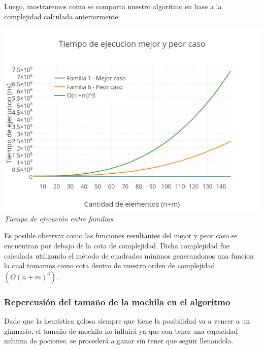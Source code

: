 Luego, mostraremos como se comporta nuestro algoritmo en base a la complejidad calculada anteriormente:

\vspace*{0.3cm} \vspace*{0.3cm}
  \begin{center}
\includegraphics[scale=0.60]{./EJ2/mejorcaso.png}
\\{\textit{Tiempo de ejecución entre familias}}
  \end{center}
  \vspace*{0.3cm}
  
  
Es posible observar como las funciones resultantes del mejor y peor caso se encuentran por debajo de la cota de complejidad. Dicha complejidad fue calculada utilizando el m\'etodo de cuadrados m\'inimos generandonos una funcion la cual tomamos como cota dentro de nuestro orden de complejidad $(O(n+m)^3)$.

\subsubsection*{Repercusi\'on del tamaño de la mochila en el algoritmo}

Dado que la heur\'istica golosa siempre que tiene la posibilidad va a vencer a un gimnasio, el tamaño de mochila no influir\'a ya que con tener una capacidad m\'inima de pociones, se proceder\'a a ganar sin tener que seguir llenandola.